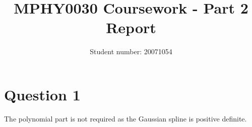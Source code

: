 \documentclass[a4paper,11pt]{article}
\title{MPHY0030 Coursework - Part 2 Report}
\date{}
\author{Student number: 20071054}
\begin{document}
\linespread{1.3}

\maketitle


\section{Question 1}
The polynomial part is not required as the Gaussian spline is positive definite.
\end{document}

